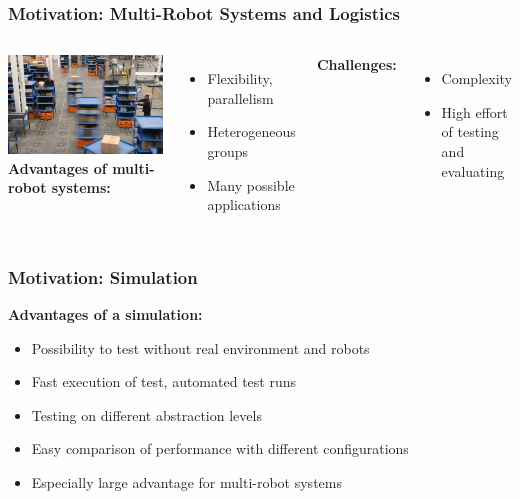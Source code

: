 \documentclass[]{beamer}
\begin{document}
\begin{frame}
  \frametitle{Motivation: Multi-Robot Systems and Logistics}
  \begin{columns}
    \includegraphics[width=\textwidth]{../pics/kiva.jpg}
    \textbf{\large Advantages of multi-robot systems:}
    \begin{itemize}
    \item Flexibility, parallelism
    \item Heterogeneous groups %
    \item Many possible applications %
    \end{itemize}
    \textbf{\large Challenges:}
    \begin{itemize}
    \item Complexity
    \item High effort of testing and evaluating
    \end{itemize}
  \end{columns}
\end{frame}

\begin{frame}
  \frametitle{Motivation: Simulation}
  \textbf{\large Advantages of a simulation:}
  \hspace{2cm}\\
  \begin{itemize}
  \item Possibility to test without real environment and robots
  \item Fast execution of test, automated test runs
  \item Testing on different abstraction levels
  \item Easy comparison of performance with different configurations 
  \item Especially large advantage for multi-robot systems
  \end{itemize}
\end{frame}
\end{document}
